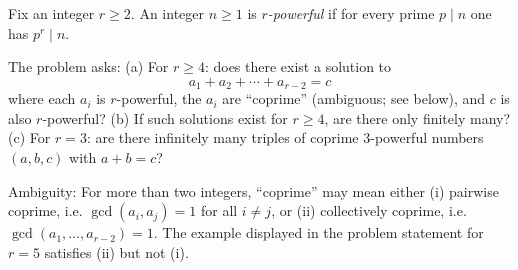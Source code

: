 Fix an integer \(r\ge 2\). An integer \(n\ge 1\) is \emph{\(r\)-powerful} if for every prime \(p\mid n\) one has \(p^r\mid n\).

The problem asks:
(a) For \(r\ge 4\): does there exist a solution to
\[a_1+a_2+\cdots + a_{r-2}=c\]
where each \(a_i\) is \(r\)-powerful, the \(a_i\) are ``coprime'' (ambiguous; see below), and \(c\) is also \(r\)-powerful?
(b) If such solutions exist for \(r\ge 4\), are there only finitely many?
(c) For \(r=3\): are there infinitely many triples of coprime \(3\)-powerful numbers \((a,b,c)\) with \(a+b=c\)?

Ambiguity: For more than two integers, ``coprime'' may mean either (i) pairwise coprime, i.e. \(\gcd(a_i,a_j)=1\) for all \(i\ne j\), or (ii) collectively coprime, i.e. \(\gcd(a_1,\dots,a_{r-2})=1\). The example displayed in the problem statement for \(r=5\) satisfies (ii) but not (i).
